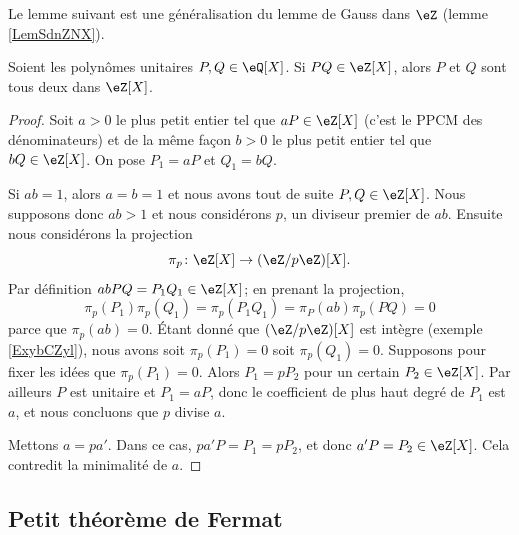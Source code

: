 Le lemme suivant est une généralisation du lemme de Gauss dans \( \eZ\) (lemme \ref{LemSdnZNX}).
\begin{lemma}       \label{LemEfdkZw}   
    Soient les polynômes unitaires \( P,Q\in \eQ[X]\). Si \( PQ\in\eZ[X]\), alors \( P\) et \( Q\) sont tous deux dans \( \eZ[X]\).
\end{lemma}

\begin{proof}
    Soit \( a>0\) le plus petit entier tel que \( aP\in\eZ[X]\) (c'est le PPCM des dénominateurs) et de la même façon \( b>0\) le plus petit entier tel que \( bQ\in \eZ[X]\). On pose \( P_1=aP\) et \( Q_1=bQ\).

    Si \( ab=1\), alors \( a=b=1\) et nous avons tout de suite \( P,Q\in \eZ[X]\). Nous supposons donc \( ab>1\) et nous considérons \( p\), un diviseur premier de \( ab\). Ensuite nous considérons la projection
    \begin{equation}
        \pi_p\colon \eZ[X]\to (\eZ/p\eZ)[X].
    \end{equation}
    Par définition \( abPQ=P_1Q_1\in \eZ[X]\); en prenant la projection,
    \begin{equation}
        \pi_p(P_1)\pi_p(Q_1)=\pi_p(P_1Q_1)=\pi_P(ab)\pi_p(PQ)=0
    \end{equation}
    parce que \( \pi_p(ab)=0\). Étant donné que \( (\eZ/p\eZ)[X]\) est intègre (exemple \ref{ExybCZyl}), nous avons soit \( \pi_p(P_1)=0\) soit \( \pi_p(Q_1)=0\). Supposons pour fixer les idées que \( \pi_p(P_1)=0\). Alors \( P_1=pP_2\) pour un certain \( P_2\in \eZ[X]\). Par ailleurs \( P\) est unitaire et \( P_1=aP\), donc le coefficient de plus haut degré de \( P_1\) est \( a\), et nous concluons que \( p\) divise \( a\).
    
    Mettons \( a=pa'\). Dans ce cas, \( pa'P=P_1=pP_2\), et donc \( a'P=P_2\in \eZ[X]\). Cela contredit la minimalité de \( a\).
\end{proof}

\subsection{Petit théorème de Fermat}

